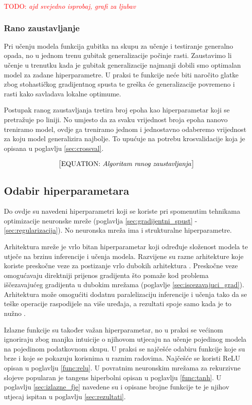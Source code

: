 \documentclass[times, utf8, diplomski]{fer}
\def\TODO#1{\noindent\textcolor{red}{TODO: \textit{#1}}\newline}
\def\todo#1{\TODO{#1}}
\def\todoeq#1{\textcolor{red}{\begin{equation}\text{\big[EQUATION: \textit{#1}\big]}\end{equation}}}
\begin{document}
\todo{ajd svejedno isprobaj, grafi za ljubav}

\subsubsection{Rano zaustavljanje}
Pri učenju modela funkcija gubitka na skupu za učenje i testiranje generalno opada, no u jednom trenu gubitak generalizacije počinje rasti. Zaustavimo li učenje u trenutku kada je gubitak generalizacije najmanji dobili smo optimalan model za zadane hiperparametre. U praksi te funkcije neće biti naročito glatke zbog stohastičkog gradijentnog spusta te greška će generalizacije povremeno i rasti kako savladava lokalne optimume.

Postupak ranog zaustavljanja tretira broj epoha kao hiperparametar koji se pretražuje po liniji. No umjesto da za svaku vrijednost broja epoha nanovo treniramo model, ovdje ga treniramo jednom i jednostavno odaberemo vrijednost za koju model generalizira najbolje. To upućuje na potrebu krosvalidacije koja je opisana u poglavlju \ref{sec:crossval}.

\todoeq{Algoritam ranog zaustavljanja}

\subsection{Odabir hiperparametara}
Do ovdje su navedeni hiperparametri koji se koriste pri spomenutim tehnikama optimizacije neuronske mreže (poglavlja \ref{sec:gradijentni_spust} - \ref{sec:regularizacija}). No neuronska mreža ima i strukturalne hiperparametre.

Arhitektura mreže je vrlo bitan hiperparametar koji određuje složenost modela te utječe na brzinu inferencije i učenja modela. Razvijene su razne arhitekture koje koriste preskočne veze za postizanje vrlo dubokih arhitektura \citep{resnet, densenet}. Preskočne veze omogućavaju direktniji prijenos gradijenta što pomaže kod problema iščezavajućeg gradijenta u dubokim mrežama (poglavlje \ref{sec:iscezavajuci_grad}). Arhitektura može omogućiti dodatnu paralelizaciju inferencije i učenja tako da se teške operacije raspodijele na više uređaja, a rezultati spoje samo kada je to nužno \citep{alexnet}.

Izlazne funkcije su također važan hiperparametar, no u praksi se većinom ignoriraju zbog manjka intuicije o njihovom utjecaju na učenje pojedinog modela na pojedinom podatkovnom skupu. U praksi se najčešće odabiru funkcije koje su brze i koje se pokazuju korisnima u raznim radovima. Najčešće se koristi ReLU opisan u poglavlju \ref{func:relu}. U povratnim neuronskim mrežama za rekurzivne slojeve popularan je tangens hiperbolni opisan u poglavlju \ref{func:tanh}. U poglavlju \ref{sec:izlazne_fje} navedene su i opisane brojne funkcije te je njihov utjecaj ispitan u poglavlju \ref{sec:rezultati}.
\end{document}
